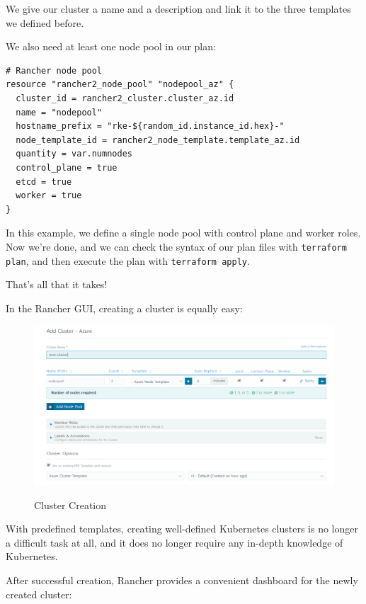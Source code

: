 We give our cluster a name and a description and link it to the three templates we defined before. 

We also need at least one node pool in our plan:

\begin{lstlisting}[caption=Node Pool, frame=single, basicstyle=\ttfamily]
# Rancher node pool
resource "rancher2_node_pool" "nodepool_az" {
  cluster_id = rancher2_cluster.cluster_az.id
  name = "nodepool"
  hostname_prefix = "rke-${random_id.instance_id.hex}-"
  node_template_id = rancher2_node_template.template_az.id
  quantity = var.numnodes
  control_plane = true
  etcd = true
  worker = true
}
\end{lstlisting}

In this example, we define a single node pool with control plane and worker roles. Now we're done, and we can check the syntax of our plan files with \verb|terraform plan|, and then execute the plan with \verb|terraform apply|.

That's all that it takes!

In the Rancher GUI, creating a cluster is equally easy:

\begin{figure}[H]
\centering
\caption {Cluster Creation}
\includegraphics[width=\linewidth]{images/cluster-creation.png}
\label{fig:clusterCreation}
\end{figure}

With predefined templates, creating well-defined Kubernetes clusters is no longer a difficult task at all, and it does no longer require any in-depth knowledge of Kubernetes.

After successful creation, Rancher provides a convenient dashboard for the newly created cluster:

